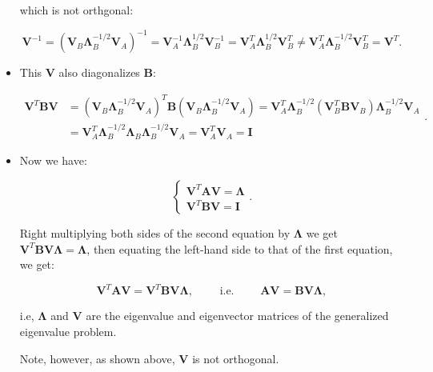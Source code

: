 \documentclass[10pt,b5paper,titlepage]{book}
\begin{document}
\begin{itemize}
        which is not orthgonal:

        \begin{equation}
            \mathbf{V}^{-1}
            =(\mathbf{V}_{B}\mathbf{\Lambda}_{B}^{-1 / 2}\mathbf{V}_{A})^{-1}
            =\mathbf{V}_{A}^{-1}\mathbf{\Lambda}_{B}^{1 / 2}\mathbf{V}_{B}^{-1}
            = \mathbf{V}_{A}^{T}\mathbf{\Lambda}_{B}^{1 / 2}\mathbf{V}_{B}^{T}
            \neq \mathbf{V}_{A}^{T}\mathbf{\Lambda}_{B}^{-1 / 2}\mathbf{V}_{B}^{T}
            =\mathbf{V}^{T}
        .\end{equation}

    \item This $\mathbf{V}$ also diagonalizes $\mathbf{B}$:

        \begin{equation}
            \begin{array}{ll}
                \mathbf{V}^{T}\mathbf{B}\mathbf{V}
                &=(\mathbf{V}_{B}\mathbf{\Lambda}_{B}^{-1 / 2}\mathbf{V}_{A})^{T}
                \mathbf{B}(\mathbf{V}_{B}\mathbf{\Lambda}_{B}^{-1 / 2}\mathbf{V}_{A})
                =\mathbf{V}_{A}^{T}\mathbf{\Lambda}_{B}^{-1 / 2}
                (\mathbf{V}_{B}^{T}\mathbf{B}\mathbf{V}_{B})\mathbf{\Lambda}_{B}^{-1 / 2}\mathbf{V}_{A}\\
                &= \mathbf{V}_{A}^{T}\mathbf{\Lambda}_{B}^{-1 / 2}\mathbf{\Lambda}_{B}
                \mathbf{\Lambda}_{B}^{-1 / 2}\mathbf{V}_{A}
                = \mathbf{V}_{A}^{T}\mathbf{V}_{A}
                = \mathbf{I}
            \end{array}
        .\end{equation}


    \item Now we have:

        \begin{equation}
            \left\{\begin{array}{l}
                \mathbf{V}^{T}\mathbf{A}\mathbf{V} = \mathbf{\Lambda} \\
                \mathbf{V}^{T}\mathbf{B}\mathbf{V} = \mathbf{I}
            \end{array}\right.
        .\end{equation}

        Right multiplying both sides of the second equation by $\mathbf{\Lambda}$
        we get $\mathbf{V}^{T}\mathbf{B}\mathbf{V}\mathbf{\Lambda} = \mathbf{\Lambda}$,
        then equating the left-hand side to that of the first equation, we get:

        \begin{equation}
            \mathbf{V}^{T}\mathbf{A}\mathbf{V}
            = \mathbf{V}^{T}\mathbf{B}\mathbf{V}\mathbf{\Lambda},
            \qquad\text{ i.e. }\qquad
            \mathbf{A}\mathbf{V} = \mathbf{B}\mathbf{V}\mathbf{\Lambda}
        ,\end{equation}

        i.e, $\mathbf{\Lambda}$ and $\mathbf{V}$ are the eigenvalue and
        eigenvector matrices of the generalized eigenvalue problem.

        Note, however, as shown above, $\mathbf{V}$ is not orthogonal.
\end{itemize}
\end{document}
